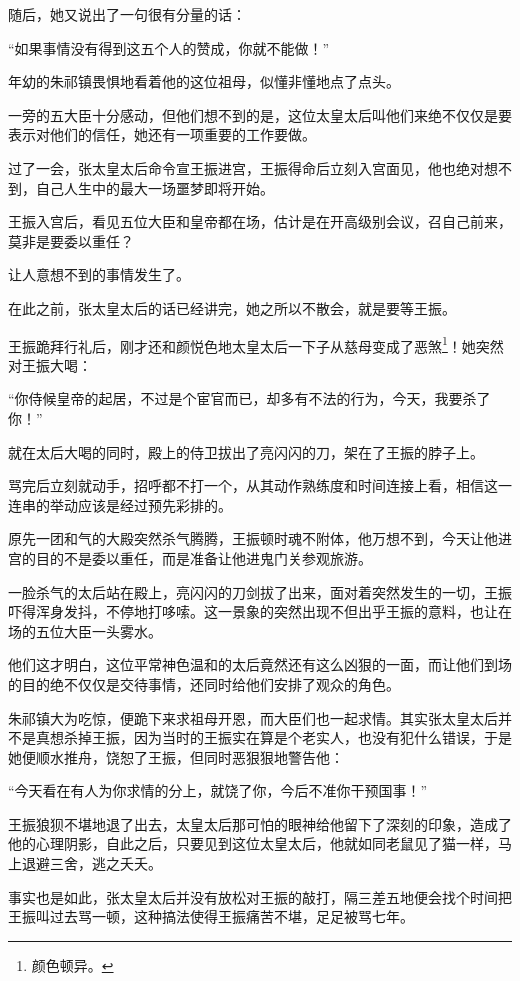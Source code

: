 \begin{multicols}{\theparacolNo}
随后，她又说出了一句很有分量的话：

“如果事情没有得到这五个人的赞成，你就不能做！”

年幼的朱祁镇畏惧地看着他的这位祖母，似懂非懂地点了点头。

一旁的五大臣十分感动，但他们想不到的是，这位太皇太后叫他们来绝不仅仅是要表示对他们的信任，她还有一项重要的工作要做。

过了一会，张太皇太后命令宣王振进宫，王振得命后立刻入宫面见，他也绝对想不到，自己人生中的最大一场噩梦即将开始。

王振入宫后，看见五位大臣和皇帝都在场，估计是在开高级别会议，召自己前来，莫非是要委以重任？

让人意想不到的事情发生了。

在此之前，张太皇太后的话已经讲完，她之所以不散会，就是要等王振。

王振跪拜行礼后，刚才还和颜悦色地太皇太后一下子从慈母变成了恶煞\footnote{颜色顿异。}！她突然对王振大喝：

“你侍候皇帝的起居，不过是个宦官而已，却多有不法的行为，今天，我要杀了你！”

就在太后大喝的同时，殿上的侍卫拔出了亮闪闪的刀，架在了王振的脖子上。

骂完后立刻就动手，招呼都不打一个，从其动作熟练度和时间连接上看，相信这一连串的举动应该是经过预先彩排的。

原先一团和气的大殿突然杀气腾腾，王振顿时魂不附体，他万想不到，今天让他进宫的目的不是委以重任，而是准备让他进鬼门关参观旅游。

一脸杀气的太后站在殿上，亮闪闪的刀剑拔了出来，面对着突然发生的一切，王振吓得浑身发抖，不停地打哆嗦。这一景象的突然出现不但出乎王振的意料，也让在场的五位大臣一头雾水。

他们这才明白，这位平常神色温和的太后竟然还有这么凶狠的一面，而让他们到场的目的绝不仅仅是交待事情，还同时给他们安排了观众的角色。

朱祁镇大为吃惊，便跪下来求祖母开恩，而大臣们也一起求情。其实张太皇太后并不是真想杀掉王振，因为当时的王振实在算是个老实人，也没有犯什么错误，于是她便顺水推舟，饶恕了王振，但同时恶狠狠地警告他：

“今天看在有人为你求情的分上，就饶了你，今后不准你干预国事！”

王振狼狈不堪地退了出去，太皇太后那可怕的眼神给他留下了深刻的印象，造成了他的心理阴影，自此之后，只要见到这位太皇太后，他就如同老鼠见了猫一样，马上退避三舍，逃之夭夭。

事实也是如此，张太皇太后并没有放松对王振的敲打，隔三差五地便会找个时间把王振叫过去骂一顿，这种搞法使得王振痛苦不堪，足足被骂七年。


\end{multicols}
